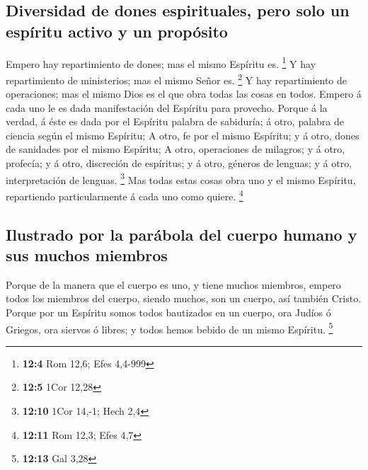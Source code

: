 \hypertarget{diversidad-de-dones-espirituales-pero-solo-un-espuxedritu-activo-y-un-propuxf3sito}{%
\subsection{Diversidad de dones espirituales, pero solo un espíritu
activo y un
propósito}\label{diversidad-de-dones-espirituales-pero-solo-un-espuxedritu-activo-y-un-propuxf3sito}}

 Empero hay repartimiento de dones; mas el mismo Espíritu
es. \footnote{\textbf{12:4} Rom 12,6; Efes 4,4-999}  Y hay
repartimiento de ministerios; mas el mismo Señor es. \footnote{\textbf{12:5}
  1Cor 12,28}  Y hay repartimiento de operaciones; mas el
mismo Dios es el que obra todas las cosas en todos. 
Empero á cada uno le es dada manifestación del Espíritu para provecho.
 Porque á la verdad, á éste es dada por el Espíritu
palabra de sabiduría; á otro, palabra de ciencia según el mismo
Espíritu;  A otro, fe por el mismo Espíritu; y á otro,
dones de sanidades por el mismo Espíritu;  A otro,
operaciones de milagros; y á otro, profecía; y á otro, discreción de
espíritus; y á otro, géneros de lenguas; y á otro, interpretación de
lenguas. \footnote{\textbf{12:10} 1Cor 14,-1; Hech 2,4} 
Mas todas estas cosas obra uno y el mismo Espíritu, repartiendo
particularmente á cada uno como quiere. \footnote{\textbf{12:11} Rom
  12,3; Efes 4,7}

\hypertarget{ilustrado-por-la-paruxe1bola-del-cuerpo-humano-y-sus-muchos-miembros}{%
\subsection{Ilustrado por la parábola del cuerpo humano y sus muchos
miembros}\label{ilustrado-por-la-paruxe1bola-del-cuerpo-humano-y-sus-muchos-miembros}}

 Porque de la manera que el cuerpo es uno, y tiene muchos
miembros, empero todos los miembros del cuerpo, siendo muchos, son un
cuerpo, así también Cristo.  Porque por un Espíritu somos
todos bautizados en un cuerpo, ora Judíos ó Griegos, ora siervos ó
libres; y todos hemos bebido de un mismo Espíritu. \footnote{\textbf{12:13}
  Gal 3,28}

